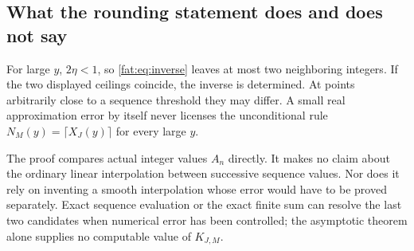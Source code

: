 \documentclass[11pt,letterpaper]{article}
\numberwithin{equation}{section}
\theoremstyle{remark}\newtheorem{remark}[theorem]{Remark}
\begin{document}
\subsection{What the rounding statement does and does not say}
For large $y$, $2\eta<1$, so \eqref{fat:eq:inverse} leaves at most two neighboring integers. If the two displayed ceilings coincide, the inverse is determined. At points arbitrarily close to a sequence threshold they may differ. A small real approximation error by itself never licenses the unconditional rule $N_M(y)=\lceil X_J(y)\rceil$ for every large $y$.

The proof compares actual integer values $A_n$ directly. It makes no claim about the ordinary linear interpolation between successive sequence values. Nor does it rely on inventing a smooth interpolation whose error would have to be proved separately. Exact sequence evaluation or the exact finite sum can resolve the last two candidates when numerical error has been controlled; the asymptotic theorem alone supplies no computable value of $K_{J,M}$.
\end{document}
